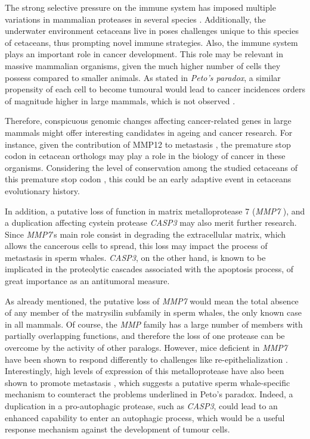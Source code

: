 The strong selective pressure on the immune system has imposed multiple variations in mammalian proteases in several species \cite{Keane2015,Puente2006,Worley2014a}.
Additionally, the underwater environment cetaceans live in poses challenges unique to this species of cetaceans, thus prompting novel immune strategies.
Also, the immune system plays an important role in cancer development.
This role may be relevant in massive mammalian organisms, given the much higher number of cells they possess compared to smaller animals.
As stated in \emph{Peto's paradox}, a similar propensity of each cell to become tumoural would lead to cancer incidences orders of magnitude higher in large mammals, which is not observed \cite{Caulin2011b}.

Therefore, conspicuous genomic changes affecting cancer-related genes in large mammals might offer interesting candidates in ageing and cancer research.
For instance, given the contribution of MMP12 to metastasis \cite{Lv2015}, the premature stop codon in cetacean orthologs may play a role in the biology of cancer in these organisms.
Considering the level of conservation among the studied cetaceans of this premature stop codon%
, this could be an early adaptive event in cetaceans evolutionary history.

In addition, a putative loss of function in matrix metalloprotease 7 (\textit{MMP7}%
), and a duplication affecting cystein protease \textit{CASP3} %
may also merit further research.
Since \textit{MMP7}'s main role consist in degrading the extracellular matrix, which allows the cancerous cells to spread, this loss may impact the process of metastasis in sperm whales.
\textit{CASP3}, on the other hand, is known to be implicated in the proteolytic cascades associated with the apoptosis process, of great importance as an antitumoral measure.

As already mentioned, the putative loss of \textit{MMP7} would mean the total absence of any member of the matrysilin subfamily in sperm whales, the only known case in all mammals.
Of course, the \textit{MMP} family has a large number of members with partially overlapping functions, and therefore the loss of one protease can be overcome by the activity of other paralogs.
However, mice deficient in \textit{MMP7} have been shown to respond differently to challenges like re-epithelialization \cite{Swee2008}.
Interestingly, high levels of expression of this metalloprotease have also been shown to promote metastasis \cite{Li2014a,Koskensalo2011}, which suggests a putative sperm whale-specific mechanism to counteract the problems underlined in Peto’s paradox.
Indeed, a duplication in a pro-autophagic protease, such as \textit{CASP3}, could lead to an enhanced capability to enter an autophagic process, which would be a useful response mechanism against the development of tumour cells.

